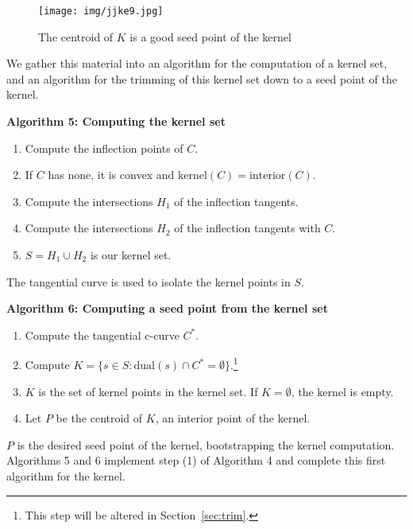 \documentclass[12pt]{article}
\begin{document}
\begin{figure}[h]
\begin{center}
\texttt{[image: img/jjke9.jpg]}
\end{center}
\caption{The centroid of $K$ is a good seed point of the kernel}
\label{fig:mean}
\end{figure}


We gather this material into an algorithm
for the computation of a kernel set, and an algorithm for
the trimming of this kernel set down to a seed point of the kernel.

\vspace{.2in}

\centerline{{\bf Algorithm 5: Computing the kernel set}}

\begin{enumerate}
\item Compute the inflection points of $C$.
\item If $C$ has none, it is convex and $\mbox{kernel}(C) = \mbox{interior}(C)$.
\item Compute the intersections $H_1$ of the inflection tangents.
\item Compute the intersections $H_2$ of the inflection tangents with $C$.
\item $S = H_1 \cup H_2$ is our kernel set.
\end{enumerate}

The tangential curve is used to isolate the kernel points in $S$.

\vspace{.2in}

\centerline{{\bf Algorithm 6: Computing a seed point from the kernel set}}

\begin{enumerate}
\item	Compute the tangential c-curve $C^*$.
\item	Compute $K = \{s \in S : \mbox{dual}(s) \cap C^* = \emptyset\}$.\footnote{This
		step will be altered in Section~\ref{sec:trim}.}
\item	$K$ is the set of kernel points in the kernel set.
	If $K = \emptyset$, the kernel is empty.
\item	Let $P$ be the centroid of $K$,
	an interior point of the kernel.
\end{enumerate}

$P$ is the desired seed point of the kernel,
bootstrapping the kernel computation.
Algorithms 5 and 6 implement step (1) of Algorithm 4
and complete this first algorithm for the kernel.
\end{document}
